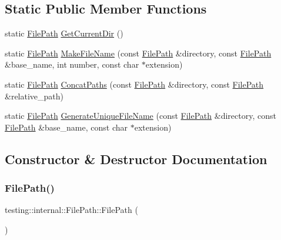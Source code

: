 \subsection*{Static Public Member Functions}
\begin{DoxyCompactItemize}
\item 
static \hyperlink{classtesting_1_1internal_1_1_file_path}{File\+Path} \hyperlink{classtesting_1_1internal_1_1_file_path_aaff39ccd7bfb7a1c09c0220a64326387}{Get\+Current\+Dir} ()
\item 
static \hyperlink{classtesting_1_1internal_1_1_file_path}{File\+Path} \hyperlink{classtesting_1_1internal_1_1_file_path_aa8c102da670261eb4fa8e2f2481df139}{Make\+File\+Name} (const \hyperlink{classtesting_1_1internal_1_1_file_path}{File\+Path} \&directory, const \hyperlink{classtesting_1_1internal_1_1_file_path}{File\+Path} \&base\+\_\+name, int number, const char $\ast$extension)
\item 
static \hyperlink{classtesting_1_1internal_1_1_file_path}{File\+Path} \hyperlink{classtesting_1_1internal_1_1_file_path_ac9d57987f60ac43f0c57b89e333e531e}{Concat\+Paths} (const \hyperlink{classtesting_1_1internal_1_1_file_path}{File\+Path} \&directory, const \hyperlink{classtesting_1_1internal_1_1_file_path}{File\+Path} \&relative\+\_\+path)
\item 
static \hyperlink{classtesting_1_1internal_1_1_file_path}{File\+Path} \hyperlink{classtesting_1_1internal_1_1_file_path_a2280a77adb394cf80bb5f73fc292e8c8}{Generate\+Unique\+File\+Name} (const \hyperlink{classtesting_1_1internal_1_1_file_path}{File\+Path} \&directory, const \hyperlink{classtesting_1_1internal_1_1_file_path}{File\+Path} \&base\+\_\+name, const char $\ast$extension)
\end{DoxyCompactItemize}


\subsection{Constructor \& Destructor Documentation}
\mbox{\label{classtesting_1_1internal_1_1_file_path_a3504a51accbca78a52fe586133ea5499}} 
\subsubsection{\texorpdfstring{File\+Path()}{FilePath()}\hspace{0.1cm}{\footnotesize\ttfamily [1/3]}}
{\footnotesize\ttfamily testing\+::internal\+::\+File\+Path\+::\+File\+Path (\begin{DoxyParamCaption}{ }\end{DoxyParamCaption})\hspace{0.3cm}{\ttfamily [inline]}}

